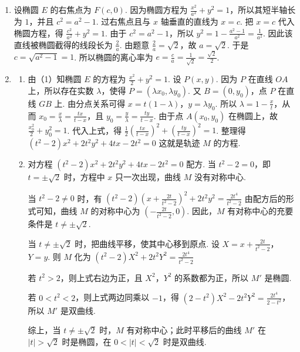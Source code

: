 \begin{solution}
\begin{enumerate}
\item 设椭圆 \(E\) 的右焦点为 \(F(c,0)\). 因为椭圆方程为 \(\frac{x^2}{a^2}+y^2=1\)，所以其短半轴长为 \(1\)，并且 \(c^2=a^2-1\).
过右焦点且与 \(x\) 轴垂直的直线为 \(x=c\). 把 \(x=c\) 代入椭圆方程，得 \(\frac{c^2}{a^2}+y^2=1\). 由于 \(c^2=a^2-1\)，所以 \(y^2=1-\frac{a^2-1}{a^2}=\frac{1}{a^2}\). 因此该直线被椭圆截得的线段长为 \(\frac{2}{a}\). 由题意 \(\frac{2}{a}=\sqrt{2}\)，故 \(a=\sqrt{2}\). 于是 \(c=\sqrt{a^2-1}=1\). 所以椭圆的离心率为 \(e=\frac{c}{a}=\frac{1}{\sqrt{2}}=\frac{\sqrt{2}}{2}\).

\item
    \begin{enumerate}
    \item 由（1）知椭圆 \(E\) 的方程为 \(\frac{x^2}{2}+y^2=1\). 设 \(P(x,y)\). 因为 \(P\) 在直线 \(OA\) 上，所以存在实数 \(\lambda\)，使得 \(P=\left( \lambda x_0,\lambda y_0 \right)\). 又 \(B=(0,y_0)\)，点 \(P\) 在直线 \(GB\) 上. 由分点关系可得 \(x=t\left( 1-\lambda \right)\)，\(y=\lambda y_0\). 所以 \(\lambda=1-\frac{x}{t}\)，从而 \(x_0=\frac{x}{\lambda}=\frac{tx}{t-x}\)，且 \(y_0=\frac{y}{\lambda}=\frac{ty}{t-x}\). 由于点 \(A(x_0,y_0)\) 在椭圆上，故 \(\frac{x_0^2}{2}+y_0^2=1\). 代入上式，得 \(\frac{1}{2}\left( \frac{tx}{t-x} \right)^2+\left( \frac{ty}{t-x} \right)^2=1\). 整理得
\(
\left( t^2-2 \right)x^2+2t^2y^2+4tx-2t^2=0
\)
这就是轨迹 \(M\) 的方程.

    \item 对方程 \(\left( t^2-2 \right)x^2+2t^2y^2+4tx-2t^2=0\) 配方. 当 \(t^2-2=0\)，即 \(t=\pm \sqrt{2}\) 时，方程中 \(x\) 只一次出现，曲线 \(M\) 没有对称中心.

当 \(t^2-2\ne 0\) 时，有
\(
\left( t^2-2 \right)\left( x+\frac{2t}{t^2-2} \right)^2+2t^2y^2=\frac{2t^4}{t^2-2}
\)
由配方后的形式可知，曲线 \(M\) 的对称中心为 \(\left( -\frac{2t}{t^2-2},0 \right)\). 因此，\(M\) 有对称中心的充要条件是 \(t\ne \pm \sqrt{2}\).

当 \(t\ne \pm \sqrt{2}\) 时，把曲线平移，使其中心移到原点. 设 \(X=x+\frac{2t}{t^2-2}\)，\(Y=y\).
则 \(M\) 化为
\(
\left( t^2-2 \right)X^2+2t^2Y^2=\frac{2t^4}{t^2-2}
\)

若 \(t^2>2\)，则上式右边为正，且 \(X^2\)，\(Y^2\) 的系数都为正，所以 \(M'\) 是椭圆.

若 \(0<t^2<2\)，则上式两边同乘以 \(-1\)，得
\(
\left( 2-t^2 \right)X^2-2t^2Y^2=\frac{2t^4}{2-t^2}
\)，
所以 \(M'\) 是双曲线.

综上，当 \(t\ne \pm \sqrt{2}\) 时，\(M\) 有对称中心；此时平移后的曲线 \(M'\) 在 \(\lvert t \rvert>\sqrt{2}\) 时是椭圆，在 \(0<\lvert t \rvert<\sqrt{2}\) 时是双曲线.
    \end{enumerate}
\end{enumerate}
\end{solution}

